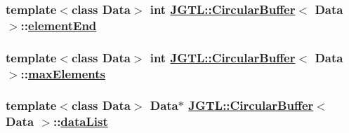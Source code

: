 \hypertarget{class_j_g_t_l_1_1_circular_buffer_a6d3e6bd25f2a41248e86791723c472b}{
\subsubsection[elementEnd]{\setlength{\rightskip}{0pt plus 5cm}template$<$class Data$>$ int \hyperlink{class_j_g_t_l_1_1_circular_buffer}{JGTL::Circular\-Buffer}$<$ Data $>$::\hyperlink{class_j_g_t_l_1_1_circular_buffer_a6d3e6bd25f2a41248e86791723c472b}{element\-End}}}
\label{class_j_g_t_l_1_1_circular_buffer_a6d3e6bd25f2a41248e86791723c472b}


\hypertarget{class_j_g_t_l_1_1_circular_buffer_8ea7004de2215b2ef442f8b408d4d0f1}{
\subsubsection[maxElements]{\setlength{\rightskip}{0pt plus 5cm}template$<$class Data$>$ int \hyperlink{class_j_g_t_l_1_1_circular_buffer}{JGTL::Circular\-Buffer}$<$ Data $>$::\hyperlink{class_j_g_t_l_1_1_circular_buffer_8ea7004de2215b2ef442f8b408d4d0f1}{max\-Elements}}}
\label{class_j_g_t_l_1_1_circular_buffer_8ea7004de2215b2ef442f8b408d4d0f1}


\hypertarget{class_j_g_t_l_1_1_circular_buffer_83b02c98de53b41f01409b6404670283}{
\subsubsection[dataList]{\setlength{\rightskip}{0pt plus 5cm}template$<$class Data$>$ Data$\ast$ \hyperlink{class_j_g_t_l_1_1_circular_buffer}{JGTL::Circular\-Buffer}$<$ Data $>$::\hyperlink{class_j_g_t_l_1_1_circular_buffer_83b02c98de53b41f01409b6404670283}{data\-List}}}
\label{class_j_g_t_l_1_1_circular_buffer_83b02c98de53b41f01409b6404670283}


